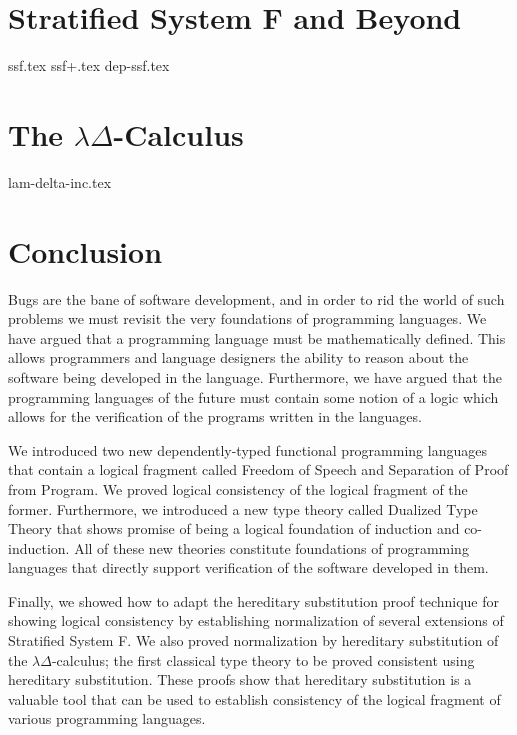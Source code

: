 \documentclass[phd,appendix,dedicationpage,ackpage,epigraphpage]{uithesis}
\begin{document}
\chapter{Stratified System F and Beyond}
\label{chap:stratified_system_f_and_beyond}
{ssf.tex}
{ssf+.tex}
{dep-ssf.tex}

\chapter{The $\lambda\Delta$-Calculus}
\label{chap:the_lambdadelta-calculus}
{lam-delta-inc.tex}


\chapter{Conclusion}
\label{chap:conclusion}

Bugs are the bane of software development, and in order to rid the
world of such problems we must revisit the very foundations of
programming languages.  We have argued that a programming language
must be mathematically defined.  This allows programmers and language
designers the ability to reason about the software being developed in
the language.  Furthermore, we have argued that the programming
languages of the future must contain some notion of a logic which
allows for the verification of the programs written in the languages.

We introduced two new dependently-typed functional programming
languages that contain a logical fragment called Freedom of Speech and
Separation of Proof from Program.  We proved logical consistency of
the logical fragment of the former.  Furthermore, we introduced a new
type theory called Dualized Type Theory that shows promise of being a
logical foundation of induction and co-induction.  All of these new
theories constitute foundations of programming languages that directly
support verification of the software developed in them.

Finally, we showed how to adapt the hereditary substitution proof
technique for showing logical consistency by establishing
normalization of several extensions of Stratified System F.  We also
proved normalization by hereditary substitution of the
$\lambda\Delta$-calculus; the first classical type theory to be proved
consistent using hereditary substitution.  These proofs show that
hereditary substitution is a valuable tool that can be used to
establish consistency of the logical fragment of various programming
languages.
\end{document}
